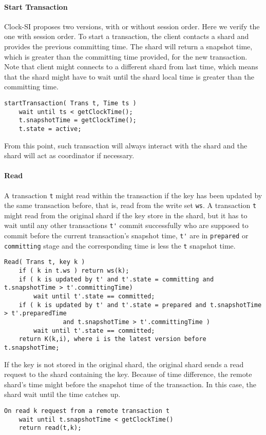 \paragraph{\bf Start Transaction}
Clock-SI proposes two versions, with or without session order.
Here we verify the one with session order.
To start a transaction, the client contacts a shard 
and provides the previous committing time.
The shard will return a snapshot time, 
which is greater than the committing time provided, for the new transaction.
Note that client might connects to a different shard from last time,
which means that 
the shard might have to wait until the shard local time is greater than the committing time.
\begin{lstlisting}[caption={Transaction runtime},label={lst:clock-si-trans-runtime}]
startTransaction( Trans t, Time ts )
    wait until ts < getClockTime();
    t.snapshotTime = getClockTime();
    t.state = active;
\end{lstlisting}
From this point, such transaction will always interact with the shard and
the shard will act as coordinator if necessary.

\paragraph{\bf Read}
A transaction \verb|t| might read within the transaction if the key has been updated by the same transaction before,
that is, read from the write set \verb|ws|.
A transaction \verb|t| might read from the original shard if the key store in the shard,
but it has to wait until any other transactions \verb|t'| commit successfully
who are supposed to commit before the current transaction's snapshot time,
\ie \verb|t'| are in \verb|prepared| or \verb|committing| stage 
and the corresponding time is less the \verb|t| snapshot time.
\begin{lstlisting}[caption={Read from original shard},label={lst:clock-si-read-original}]
Read( Trans t, key k )
    if ( k in t.ws ) return ws(k);
    if ( k is updated by t' and t'.state = committing and t.snapshotTime > t'.committingTime)
        wait until t'.state == committed;
    if ( k is updated by t' and t'.state = prepared and t.snapshotTime > t'.preparedTime 
                and t.snapshotTime > t'.committingTime )
        wait until t'.state == committed;
    return K(k,i), where i is the latest version before t.snapshotTime;
\end{lstlisting}
If the key is not stored in the original shard, 
the original shard sends a read request to the shard containing the key.
Because of time difference, the remote shard's time might before the snapshot time of the transaction.
In this case, the shard wait until the time catches up.
\begin{lstlisting}[caption={Read from original shard},label={lst:clock-si-read-original}]
On read k request from a remote transaction t
    wait until t.snapshotTime < getClockTime() 
    return read(t,k);
\end{lstlisting}

